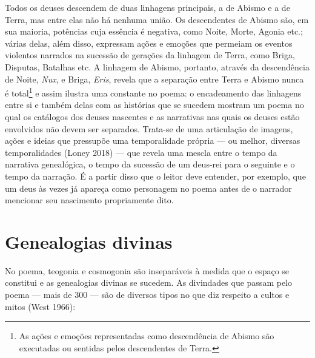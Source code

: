 Todos os deuses descendem de duas linhagens principais, a de Abismo e a
de Terra, mas entre elas não há nenhuma união. Os descendentes de Abismo
são, em sua maioria, potências cuja essência é negativa, como Noite, Morte,
Agonia etc.; várias delas, além disso, expressam ações e emoções que
permeiam os eventos violentos narrados na sucessão de gerações da
linhagem de Terra, como Briga, Disputas, Batalhas etc. A linhagem de
Abismo, portanto, através da descendência de Noite, \textit{Nux}, e Briga, \textit{Eris}, revela que a separação entre Terra e Abismo nunca é total\footnote{As ações e emoções representadas como descendência de Abismo são
executadas ou sentidas pelos descendentes de Terra.} e assim ilustra uma
constante no poema: o encadeamento das linhagens entre si e também delas
com as histórias que se sucedem mostram um poema no qual os catálogos
dos deuses nascentes e as narrativas nas quais os deuses estão
envolvidos não devem ser separados. Trata-se de uma articulação de
imagens, ações e ideias que pressupõe uma temporalidade própria --- ou
melhor, diversas temporalidades (Loney 2018) --- que revela uma mescla
entre o tempo da narrativa genealógica, o tempo da sucessão de um
deus-rei para o seguinte e o tempo da narração. É a partir disso que o
leitor deve entender, por exemplo, que um deus às vezes já apareça como
personagem no poema antes de o narrador mencionar seu nascimento
propriamente dito.

\section{Genealogias divinas}

No poema, teogonia e cosmogonia são inseparáveis à medida que o espaço
se constitui e as genealogias divinas se sucedem. As divindades que
passam pelo poema --- mais de 300 --- são de diversos tipos no que diz
respeito a cultos e mitos (West 1966): 

